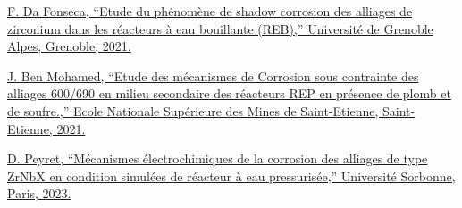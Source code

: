 \documentclass[11pt, a4paper, notitlepage]{article}
\begin{document}
    \href{http://www.theses.fr/s222058}{F. Da Fonseca, “Etude du phénomène de shadow corrosion des alliages de zirconium dans les réacteurs à eau bouillante (REB),” Université de Grenoble Alpes, Grenoble, 2021.}


    \href{http://www.theses.fr/s217506}{J. Ben Mohamed, “Etude des mécanismes de Corrosion sous contrainte des alliages 600/690 en milieu secondaire des réacteurs REP en présence de plomb et de soufre.,” Ecole Nationale Supérieure des Mines de Saint-Etienne, Saint-Etienne, 2021.}
    
    \href{http://www.theses.fr/s278984}{D. Peyret, “Mécanismes électrochimiques de la corrosion des alliages de type ZrNbX en condition simulées de réacteur à eau pressurisée,” Université Sorbonne, Paris, 2023.}
	
	\newpage
	\nocite{*}
	\printbibliography[title=Publications]
	
\end{document}
